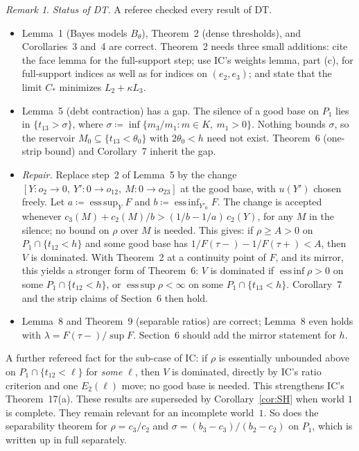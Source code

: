 \documentclass[11pt]{article}
\theoremstyle{definition}\newtheorem{definition}[theorem]{Definition}
\theoremstyle{remark}\newtheorem{remark}[theorem]{Remark}
\begin{document}
\begin{remark}\label{rem:DT}
\emph{Status of DT.} A referee checked every result of DT.
\begin{itemize}[leftmargin=*,itemsep=2pt]
\item Lemma~1 (Bayes models $B_\theta$), Theorem~2 (dense thresholds), and
Corollaries~3 and~4 are correct. Theorem~2 needs three small additions: cite
the face lemma for the full-support step; use IC's weights lemma, part (c),
for full-support indices as well as for indices on $(e_2,e_3)$; and state
that the limit $C_*$ minimizes $L_2+\kappa L_3$.
\item Lemma~5 (debt contraction) has a gap. The silence of a good base on
$P_1$ lies in $\{t_{13}>\sigma\}$, where
$\sigma\coloneqq\inf\{m_3/m_1:m\in K,\ m_1>0\}$. Nothing bounds $\sigma$, so
the reservoir $M_0\subseteq\{t_{13}<\theta_0\}$ with $2\theta_0<h$ need not
exist. Theorem~6 (one-strip bound) and Corollary~7 inherit the gap.
\item \emph{Repair.} Replace step~2 of Lemma~5 by the change
$[Y\colon o_2\to0,\ Y'\colon0\to o_{12},\ M\colon0\to o_{23}]$ at the good
base, with $u(Y')$ chosen freely. Let $a\coloneqq\operatorname{ess\,sup}_YF$
and $b\coloneqq\operatorname{ess\,inf}_{Y'_0}F$. The change is accepted
whenever $c_3(M)+c_2(M)/b>(1/b-1/a)\,c_2(Y)$, for any $M$ in the silence;
no bound on $\rho$ over $M$ is needed. This gives: if $\rho\ge A>0$ on
$P_1\cap\{t_{12}<h\}$ and some good base has
$1/F(\tau-)-1/F(\tau+)<A$, then $V$ is dominated. With Theorem~2 at a
continuity point of $F$, and its mirror, this yields a stronger form of
Theorem~6: $V$ is dominated if $\operatorname{ess\,inf}\rho>0$ on some
$P_1\cap\{t_{12}<h\}$, or $\operatorname{ess\,sup}\rho<\infty$ on some
$P_1\cap\{t_{13}<h\}$. Corollary~7 and the strip claims of Section~6 then
hold.
\item Lemma~8 and Theorem~9 (separable ratios) are correct; Lemma~8 even
holds with $\lambda=F(\tau-)/\sup F$. Section~6 should add the mirror
statement for $h$.
\end{itemize}
A further refereed fact for the sub-case of IC: if $\rho$ is essentially
unbounded above on $P_1\cap\{t_{12}<\ell\}$ for \emph{some} $\ell$, then $V$
is dominated, directly by IC's ratio criterion and one $E_2(\ell)$ move; no
good base is needed. This strengthens IC's Theorem~17(a). These results are
superseded by Corollary~\ref{cor:SH} when world $1$ is complete. They remain relevant for an incomplete world~$1$. So does
the separability theorem for $\rho=c_3/c_2$ and
$\sigma=(b_3-c_3)/(b_2-c_2)$ on $P_1$, which is written up in full
separately.
\end{remark}
\end{document}
